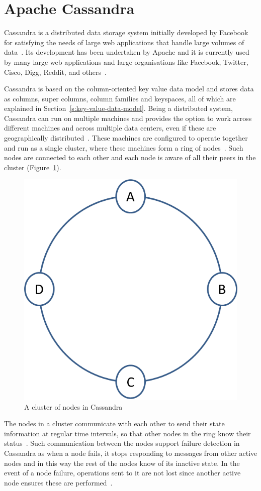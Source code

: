 \section{Apache Cassandra} \label{s:Background-Cassandra}

Cassandra is a distributed data storage system initially developed by Facebook
for satisfying the needs of large web applications that handle large
volumes of data~\citep{BOOK}. 
Its development has been undertaken by Apache  and it is  currently used by
many large web applications and large organisations like Facebook,  Twitter, 
Cisco,  Digg,  Reddit, and others~\citep{datastaxB}. 

Cassandra is based on the column-oriented key value data model and stores data
as columns,  super columns,  column families and keyspaces, all of which are
explained in Section~\ref{s:key-value-data-model}. Being a distributed
system, Cassandra can run on multiple machines 
and provides the option  to work across different machines and across
multiple data centers,  even if these  are geographically
distributed~\citep{BOOK}.
These machines  are configured to operate together and
run as a single cluster, where these
 machines form a ring of nodes~\citep{datastax,BOOK}. Such
nodes are connected to each other and each node is aware of all their peers in
the cluster (Figure~\ref{f:cassandra-cluster}).


\begin{figure}[h] \centering 
\includegraphics[width=.3\textwidth]{./figure/Background/CassandraCluster.png}
	\caption{A cluster of nodes in Cassandra}\label{f:cassandra-cluster}
\end{figure}

The nodes in a cluster communicate with each other to send their state
information at regular time intervals,  so that other nodes in the ring  know
their status~\citep{BOOK,cassandra}. Such communication
between the nodes support failure detection in Cassandra as when
 a node fails,  it stops responding to messages from other
active nodes and in this way the rest of the nodes  know of its inactive state.
In the event of a node failure,
operations sent to it are not lost since another active node ensures these are
performed~\citep{cassandra}.

